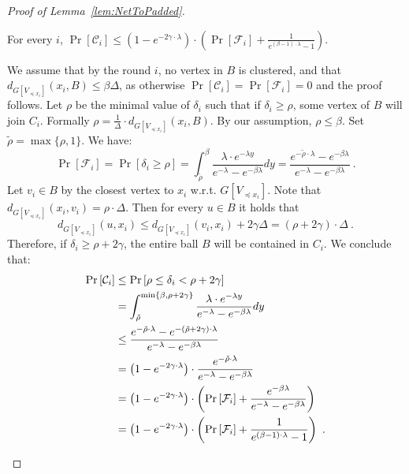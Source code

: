 \documentclass{theoretics}
\begin{document}
\begin{proof}[Proof of Lemma~\ref{lem:NetToPadded}]
	\begin{claim}
		For every $i$, 
		$\Pr\left[\mathcal{C}_{i}\right]\le\left(1-e^{-2\gamma\cdot\lambda}\right)\cdot\left(\Pr\left[\mathcal{F}_{i}\right]+\frac{1}{e^{(\beta-1)\cdot\lambda}-1}\right)$.
	\end{claim}
	\begin{subproof}
		We assume that by the round $i$, no vertex in $B$ is clustered, and that $d_{G[V_{\preceq x_i}]}(x_{i},B)\le\beta\Delta$, as otherwise $\Pr[\mathcal{C}_i]=\Pr[\mathcal{F}_i]=0$ and the proof follows.
		Let $\rho$ be the minimal value of $\delta_{i}$ such that if $\delta_{i}\ge\rho$, some vertex of $B$ will join $C_i$.
		Formally $\rho=\frac{1}{\Delta}\cdot d_{G[V_{\preceq x_i}]}(x_{i},B)$.
		By our assumption, $\rho\le\beta$. Set $\tilde{\rho}=\max\{\rho,1\}$. We have:
		\[
		\Pr\left[\mathcal{F}_{i}\right]=\Pr\left[\delta_{i}\ge\rho\right]=\int_{\tilde{\rho}}^{\beta}\frac{\lambda\cdot e^{-\lambda y}}{e^{-\lambda}-e^{-\beta\lambda}}dy=\frac{e^{-\tilde{\rho}\cdot\lambda}-e^{-\beta\lambda}}{e^{-\lambda}-e^{-\beta\lambda}}~.
		\]
		Let $v_i\in B$ by the closest vertex to $x_i$ w.r.t. $G[V_{\preceq x_i}]$. Note that $d_{G[V_{\preceq x_i}]}(x_{i},v_i)=\rho\cdot\Delta$.
		Then for every $u\in B$ it holds that
		\[
		d_{G[V_{\preceq x_i}]}(u,x_{i})\le d_{G[V_{\preceq x_i}]}(v_{i},x_{i})+2\gamma\Delta=\left(\rho+2\gamma\right)\cdot\Delta~.
		\]
		Therefore,  if $\delta_{i}\ge\rho+2\gamma$, the entire ball $B$ will be contained in $C_i$.
		We conclude that:
		\begin{align*}
			\Pr\left[\mathcal{C}_{i}\right] & \le\Pr\left[\rho\le\delta_{i}<\rho+2\gamma\right]\\
			& =\int_{\tilde{\rho}}^{\min\left\{ \beta,\rho+2\gamma\right\} }\frac{\lambda\cdot e^{-\lambda y}}{e^{-\lambda}-e^{-\beta\lambda}}dy\\
			& \le\frac{e^{-\tilde{\rho}\cdot\lambda}-e^{-\left(\tilde{\rho}+2\gamma\right)\cdot\lambda}}{e^{-\lambda}-e^{-\beta\lambda}}\\
			& =\left(1-e^{-2\gamma\cdot\lambda}\right)\cdot\frac{e^{-\tilde{\rho}\cdot\lambda}}{e^{-\lambda}-e^{-\beta\lambda}}\\
			& =\left(1-e^{-2\gamma\cdot\lambda}\right)\cdot\left(\Pr\left[\mathcal{F}_{i}\right]+\frac{e^{-\beta\lambda}}{e^{-\lambda}-e^{-\beta\lambda}}\right)\\
			& =\left(1-e^{-2\gamma\cdot\lambda}\right)\cdot\left(\Pr\left[\mathcal{F}_{i}\right]+\frac{1}{e^{(\beta-1)\cdot\lambda}-1}\right)~.\qedhere
		\end{align*}
	\end{subproof}
	

\end{proof}
\end{document}
